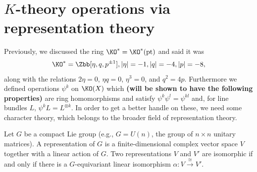 \fi
{}
\section{\texorpdfstring{$K$}{K}-theory operations via representation theory} %
\label{BuildingKtheoryOperatorsFromRepTheory}
\ifx\OutputBuildingKtheoryOperatorsFromRepTheory\undefined\else
Previously, we discussed the ring $\KO^* = \KO^*(\ptspace)$ and said it was
\[
\KO^* = \Zbb[\eta, q, p^{\pm 1}], |\eta| = -1, |q| = -4, |p| = -8
,\]
along with the relations $2 \eta = 0$, $\eta q = 0$, $\eta^3 = 0$, and $q^2 = 4p$.  Furthermore we defined operations $\psi^k$ on $\KO(X)$ which \textbf{(will be shown to have the following properties)} are ring homomorphisms and satisfy $\psi^k \psi^l = \psi^{kl}$ and, for line bundles $L$, $\psi^k L = L^{\otimes k}$.  In order to get a better handle on these, we need some character theory, which belongs to the broader field of representation theory.

Let $G$ be a compact Lie group (e.g., $G=U(n)$, the group of $n\times n$ unitary matrices).  A representation of $G$ is a finite-dimensional complex vector space $V$ together with a linear action of $G$.  Two representations $V$ and $V'$ are isomorphic if and only if there is a $G$-equivariant linear isomorphism $\alpha: V \stackrel{\cong}{\to} V'$.

